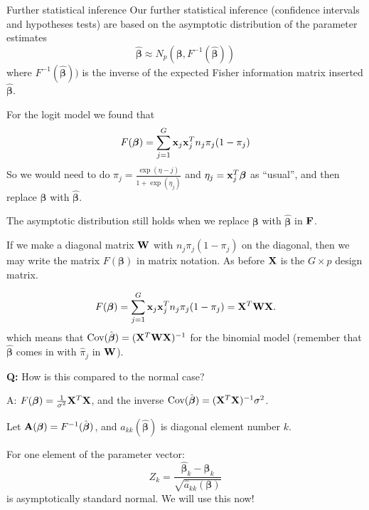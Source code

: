 \documentclass[
  ignorenonframetext,
]{beamer}
\begin{document}
\begin{frame}{Further statistical inference}
\label{further-statistical-inference}
Our further statistical inference (confidence intervals and hypotheses
tests) are based on the asymptotic distribution of the parameter
estimates
\[\hat{\boldsymbol{\beta}} \approx N_p(\boldsymbol{\beta},F^{-1}(\hat{\boldsymbol{\beta}}))\]
where \(F^{-1}(\hat{\boldsymbol{\beta}}))\) is the inverse of the
expected Fisher information matrix inserted
\(\hat{\boldsymbol{\beta}}\).

For the logit model we found that
\[F(\boldsymbol{\beta})=\sum_{j=1}^G {\bf x}_j {\bf x}_j^T n_j \pi_j (1-\pi_j)\]
So we would need to do \(\pi_j=\frac{\exp(\eta-j)}{1+\exp(\eta_j)}\) and
\(\eta_j={\bf x}_j^T\boldsymbol{\beta}\) as ``usual'', and then replace
\(\boldsymbol{\beta}\) with \(\hat{\boldsymbol{\beta}}\).

The asymptotic distribution still holds when we replace
\(\boldsymbol{\beta}\) with \(\hat{\boldsymbol{\beta}}\) in \({\bf F}\).
\end{frame}

\begin{frame}
If we make a diagonal matrix \({\bf W}\) with \(n_j \pi_j (1-\pi_j)\) on
the diagonal, then we may write the matrix \(F(\boldsymbol{\beta})\) in
matrix notation. As before \({\bf X}\) is the \(G\times p\) design
matrix.

\[F(\boldsymbol{\beta})=\sum_{j=1}^G {\bf x}_j {\bf x}_j^T n_j \pi_j (1-\pi_j)={\bf X}^T {\bf W} {\bf X}.\]
which means that
\(\text{Cov}(\hat{\boldsymbol{\beta}})=({\bf X}^T {\bf W} {\bf X})^{-1}\)
for the binomial model (remember that \(\hat{\boldsymbol{\beta}}\) comes
in with \(\hat{\pi}_j\) in \({\bf W}\)).

\textbf{Q:} How is this compared to the normal case?

A: \(F(\boldsymbol{\beta})=\frac{1}{\sigma^2}{\bf X}^T{\bf X}\), and the
inverse
\(\text{Cov}(\hat{\boldsymbol{\beta}})=({\bf X}^T {\bf X})^{-1}\sigma^2\).
\end{frame}

\begin{frame}
Let \({\bf A}(\boldsymbol{\beta})=F^{-1}(\hat{\boldsymbol{\beta}})\),
and \(a_{kk}(\hat{\boldsymbol{\beta}})\) is diagonal element number
\(k\).

For one element of the parameter vector:
\[ Z_k=\frac{\hat{\boldsymbol{\beta}}_k-\boldsymbol{\beta}_k}{\sqrt{\hat{a}_{kk}({\boldsymbol{\beta}})}}\]
is asymptotically standard normal. We will use this now!
\end{frame}
\end{document}
